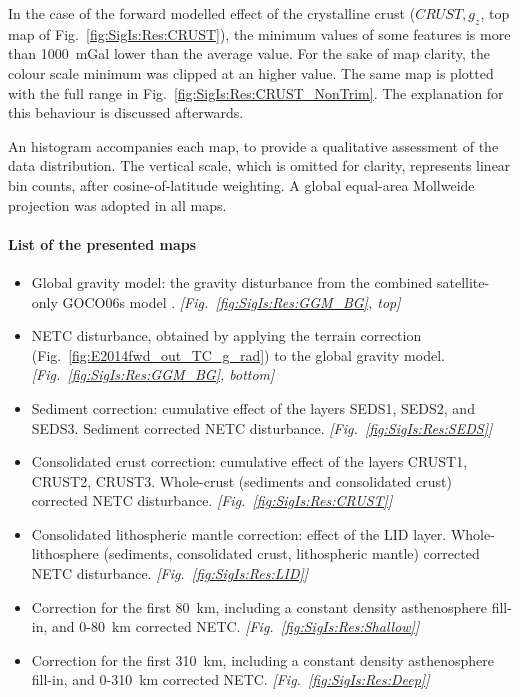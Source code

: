In the case of the forward modelled effect of the crystalline crust ($CRUST, g_z$, top map of Fig.~\ref{fig:SigIs:Res:CRUST}), the minimum values of some features is more than \SI{1000}{mGal} lower than the average value.
For the sake of map clarity, the colour scale minimum was clipped at an higher value.
The same map is plotted with the full range in Fig.~\ref{fig:SigIs:Res:CRUST_NonTrim}.
The explanation for this behaviour is discussed afterwards.

An histogram accompanies each map, to provide a qualitative assessment of the data distribution.
The vertical scale, which is omitted for clarity, represents linear bin counts, after cosine-of-latitude weighting.
A global equal-area Mollweide projection was adopted in all maps.

\paragraph{List of the presented maps}
\begin{itemize}
    \item Global gravity model: the gravity disturbance from the combined satellite-only GOCO06s model \parencite{Kvas2019GOCO06s_ICGEM}. \textit{[Fig.~\ref{fig:SigIs:Res:GGM_BG}, top]}
    \item NETC disturbance, obtained by applying the terrain correction (Fig.~\ref{fig:E2014fwd_out_TC_g_rad}) to the global gravity model. \textit{[Fig.~\ref{fig:SigIs:Res:GGM_BG}, bottom]}
    \item Sediment correction: cumulative effect of the layers SEDS1, SEDS2, and SEDS3. Sediment corrected NETC disturbance. \textit{[Fig.~\ref{fig:SigIs:Res:SEDS}]}
    \item Consolidated crust correction: cumulative effect of the layers CRUST1, CRUST2, CRUST3. Whole-crust (sediments and consolidated crust) corrected NETC disturbance. \textit{[Fig.~\ref{fig:SigIs:Res:CRUST}]}
    \item Consolidated lithospheric mantle correction: effect of the LID layer. Whole-lithosphere (sediments, consolidated crust, lithospheric mantle) corrected NETC disturbance. \textit{[Fig.~\ref{fig:SigIs:Res:LID}]}
    \item Correction for the first \SI{80}{\kilo \metre}, including a constant density asthenosphere fill-in, and \num{0}-\SI{80}{\kilo \metre} corrected NETC. \textit{[Fig.~\ref{fig:SigIs:Res:Shallow}]}
    \item Correction for the first \SI{310}{\kilo \metre}, including a constant density asthenosphere fill-in, and \num{0}-\SI{310}{\kilo \metre} corrected NETC. \textit{[Fig.~\ref{fig:SigIs:Res:Deep}]}
\end{itemize}

